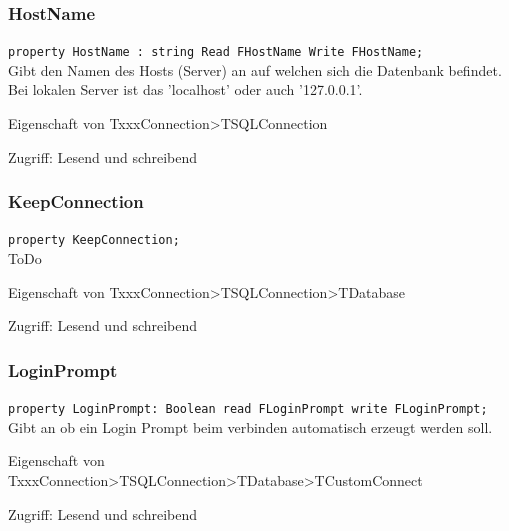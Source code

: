 \subsubsection{HostName}
\begin{description}
  \item \texttt{property HostName : string Read FHostName Write FHostName;}\\Gibt den Namen des Hosts (Server) an auf welchen sich die Datenbank befindet. Bei lokalen Server ist das 'localhost' oder auch '127.0.0.1'.
  \begin{description}
    \item Eigenschaft von TxxxConnection>TSQLConnection
  \end{description}
  \begin{description}
    \item Zugriff: Lesend und schreibend
  \end{description}
\end{description}

\subsubsection{KeepConnection}
\begin{description}
  \item \texttt{property KeepConnection;}\\ToDo
  \begin{description}
    \item Eigenschaft von TxxxConnection>TSQLConnection>TDatabase
  \end{description}
  \begin{description}
    \item Zugriff: Lesend und schreibend
  \end{description}
\end{description}

\subsubsection{LoginPrompt}
\begin{description}
  \item \texttt{property LoginPrompt: Boolean read FLoginPrompt write FLoginPrompt;}\\Gibt an ob ein Login Prompt beim verbinden automatisch erzeugt werden soll.
  \begin{description}
    \item Eigenschaft von TxxxConnection>TSQLConnection>TDatabase>TCustomConnect
  \end{description}
  \begin{description}
    \item Zugriff: Lesend und schreibend
  \end{description}
\end{description}

